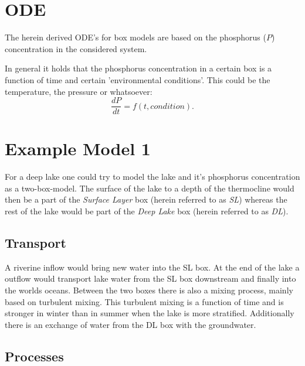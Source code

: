 \documentclass[12pt,twoside]{article}
\begin{document}
\pagestyle{plain}
\setcounter{figure}{0} \renewcommand{\thefigure}{\arabic{figure}} 
\pagestyle{fancy}

\section{ODE}
The herein derived ODE's for box models are based on the phosphorus ($P$) concentration in the considered system.

In general it holds that the phosphorus concentration in a certain box is a function of time and certain 'environmental conditions'. This could be the temperature, the pressure or whatsoever:
\begin{equation}
\frac{dP}{dt} = f(t, condition).
\end{equation}

\section{Example Model 1}
For a deep lake one could try to model the lake and it's phosphorus concentration as a two-box-model. The surface of the lake to a depth of the thermocline would then be a part of the \textit{Surface Layer} box (herein referred to as \textit{SL}) whereas the rest of the lake would be part of the \textit{Deep Lake} box (herein referred to as \textit{DL}).

\subsection{Transport}
A riverine inflow would bring new water into the SL box. At the end of the lake a outflow would transport lake water from the SL box downstream and finally into the worlds oceans. Between the two boxes there is also a mixing process, mainly based on turbulent mixing. This turbulent mixing is a function of time and is stronger in winter than in summer when the lake is more stratified. Additionally there is an exchange of water from the DL box with the groundwater.

\subsection{Processes}





%

\pagestyle{plain}

\printbibliography
\end{document}
